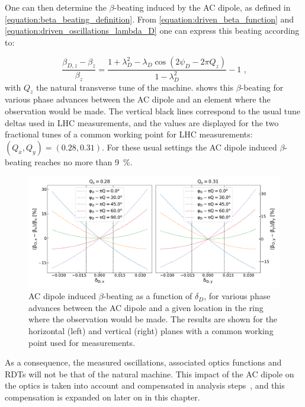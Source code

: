 One can then determine the \(\beta\)-beating induced by the AC dipole, as defined in \cref{equation:beta_beating_definition}.
From \cref{equation:driven_beta_function} and \cref{equation:driven_oscillations_lambda_D} one can express this beating according to:

\begin{equation}
  \frac{\beta_{D,z} - \beta_z}{\beta_z} = \frac{1 + \lambda_D^2 - \lambda_D \cos \left(2 \psi_D - 2 \pi Q_z\right)}{1 - \lambda_D^2} - 1 \text{ ,}
  \label{equation:ac_dipole_beta_beating}
\end{equation}
with \(Q_z\) the natural transverse tune of the machine.
 shows this \(\beta\)-beating for various phase advances between the AC dipole and an element where the observation would be made.
The vertical black lines correspond to the usual tune deltas used in LHC measurements, and the values are displayed for the two fractional tunes of a common working point for LHC measurements: \((Q_x, Q_y) = (0.28, 0.31)\).
For these usual settings the AC dipole induced \(\beta\)-beating reaches no more than \qty{9}{\percent}.

\begin{figure}[!htb]
  \centering
  \includegraphics*[width=0.99\linewidth]{Figures/Optics_Measurements_Corrections_at_LHC/bbeatings_acdipole.pdf}
  \caption{AC dipole induced \(\beta\)-beating as a function of \(\delta_D\), for various phase advances between the AC dipole and a given location in the ring where the observation would be made. The results are shown for the horizontal (left) and vertical (right) planes with a common working point used for measurements.}
  \label{figure:ac_dipole_induced_beta_beating}
\end{figure}

As a consequence, the measured oscillations, associated optics functions and \glspl{RDT} will not be that of the natural machine.
This impact of the AC dipole on the optics is taken into account and compensated in analysis steps~\cite{IPAC:Miyamoto:Measurement_Coupling_RDTs_LHC_AC_Dipole}, and this compensation is expanded on later on in this chapter.


